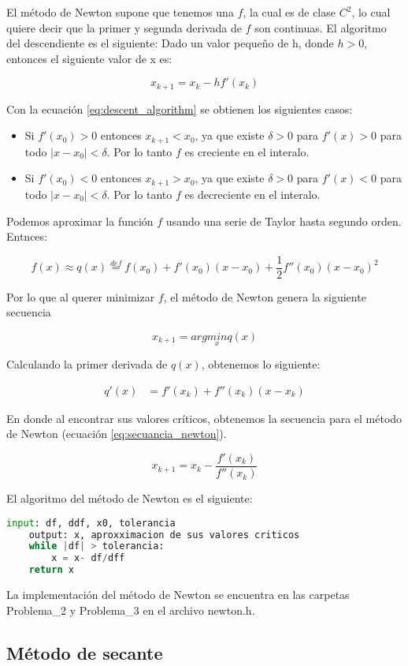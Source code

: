 El método de Newton supone que tenemos una $f$, la cual es de clase $C^2$, lo cual quiere decir que la primer y segunda derivada de $f$ son continuas. El algoritmo del descendiente es el siguiente:
Dado un valor pequeño de h, donde $h>0$, entonces el siguiente valor de x es:

\begin{equation}
    x_{k+1} = x_k -hf'(x_k)
    \label{eq:descent_algorithm}
\end{equation}

Con la ecuación \ref{eq:descent_algorithm} se obtienen los siguientes casos:
\begin{itemize}
    \item Si $f'(x_0)>0$ entonces $x_{k+1}<x_0$, ya que existe $\delta>0$ para $f'(x)>0$ para todo $|x-x_0|<\delta$. Por lo tanto $f$ es creciente en el interalo.
    \item Si $f'(x_0)<0$ entonces $x_{k+1}>x_0$, ya que existe $\delta>0$ para $f'(x)<0$ para todo $|x-x_0|<\delta$. Por lo tanto $f$ es decreciente en el interalo.
\end{itemize}

Podemos aproximar la función $f$ usando una serie de Taylor hasta segundo orden. Entnces:

\begin{equation*}
    f(x) \approx q(x) \overset{def}{=} f(x_0)+ f'(x_0)(x-x_0) + \frac{1}{2} f''(x_0)(x-x_0)^2
\end{equation*}

Por lo que al querer minimizar $f$, el método de Newton genera la siguiente secuencia

\begin{equation*}
    x_{k+1} = arg \underset{x}{min} q(x)
\end{equation*}

Calculando la primer derivada de $q(x)$, obtenemos lo siguiente:

\begin{align*}
    q'(x) & = f'(x_k)+ f''(x_k) (x-x_k)
\end{align*}

En donde al encontrar sus valores críticos, obtenemos la secuencia para el método de Newton (ecuación \ref{eq:secuancia_newton}).

\begin{equation}
    x_{k+1} = x_k - \frac{f'(x_k)}{f''(x_k)}
    \label{eq:secuancia_newton}
\end{equation}

El algoritmo del método de Newton es el siguiente:

\begin{lstlisting}[language=python]
    input: df, ddf, x0, tolerancia
    output: x, aproxximacion de sus valores criticos
    while |df| > tolerancia:
        x = x- df/dff
    return x
\end{lstlisting}

La implementación del método de Newton se encuentra en las carpetas \textcolor{citecolor}{Problema\_2} y \textcolor{citecolor}{Problema\_3} en el archivo \textcolor{title}{newton.h}.
\subsection*{Método de secante}